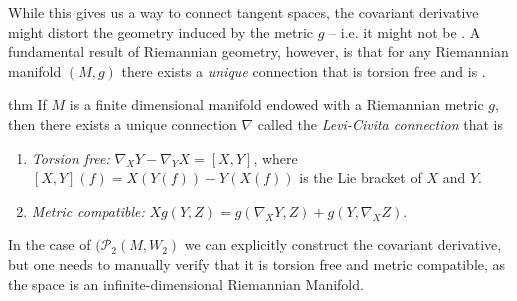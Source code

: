 \documentclass[11pt]{article}
\newcommand{\man}{M}
\begin{document}
While this gives us a way to connect tangent spaces, the covariant derivative might distort the geometry induced by the metric $g$ -- i.e. it might not be . A fundamental result of Riemannian geometry, however, is that for any Riemannian manifold $(\man, g)$ there exists a \textit{unique} connection that is torsion free and is . 

\begin{restatable}{thm}{}
    If $\man$ is a finite dimensional manifold endowed with a Riemannian metric $g$, then there exists a unique connection $\nabla$ called the \textit{Levi-Civita connection} that is
    \begin{enumerate}
        \item \textit{Torsion free:} $\nabla_XY - \nabla_YX = [X,Y]$, where $[X,Y](f) = X(Y(f)) -Y(X(f))$ is the Lie bracket of $X$ and $Y$. 
        \item \textit{Metric compatible:} $Xg(Y, Z) = g(\nabla_XY, Z) + g(Y, \nabla_XZ).$ 
    \end{enumerate}
\end{restatable}
In the case of $(\mathcal{P}_2(\man, W_2)$ we can explicitly construct the covariant derivative, but one needs to manually verify that it is torsion free and metric compatible, as the space is an infinite-dimensional Riemannian Manifold.
\end{document}
